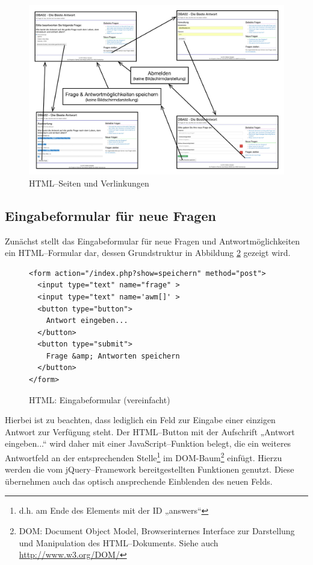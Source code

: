 \begin{figure}[h]
\begin{center}
\includegraphics[width=\textwidth]{zustaende.jpg}
\caption{HTML--Seiten und Verlinkungen}
\label{fig:zustaende}
\end{center}
\end{figure}

\subsection{Eingabeformular für neue Fragen}

Zunächst stellt das Eingabeformular für neue Fragen und Antwortmöglichkeiten ein HTML--Formular dar, dessen Grundstruktur in Abbildung \ref{html:inputform} gezeigt wird. 

\begin{figure}[h]
\begin{spacing}{1.0}
\begin{verbatim}
<form action="/index.php?show=speichern" method="post">
  <input type="text" name="frage" >
  <input type="text" name='awm[]' >
  <button type="button">
    Antwort eingeben...
  </button>
  <button type="submit">
    Frage &amp; Antworten speichern
  </button>
</form>
\end{verbatim}
\caption{HTML: Eingabeformular (vereinfacht)}
\label{html:inputform}
\end{spacing}
\end{figure}

Hierbei ist zu beachten, dass lediglich ein Feld zur Eingabe einer einzigen Antwort zur Verfügung steht. Der HTML--Button mit der Aufschrift „Antwort eingeben...“ wird daher mit einer JavaScript--Funktion belegt, die ein weiteres Antwortfeld an der entsprechenden Stelle\footnote{d.h. am Ende des Elements mit der ID „answers“} im DOM-Baum\footnote{DOM: Document Object Model, Browserinternes Interface zur Darstellung und Manipulation des HTML--Dokuments. Siehe auch \url{http://www.w3.org/DOM/}} einfügt. Hierzu werden die vom jQuery--Framework bereitgestellten Funktionen genutzt. Diese übernehmen auch das optisch ansprechende Einblenden des neuen Felds.

